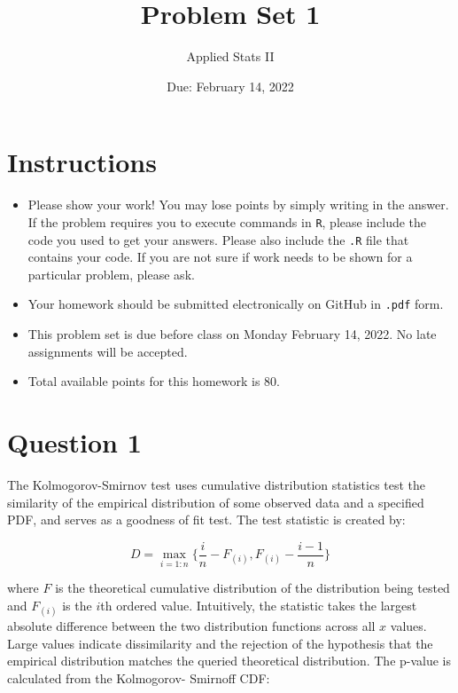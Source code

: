 \documentclass[12pt,letterpaper]{article}
\title{Problem Set 1}
\date{Due: February 14, 2022}
\author{Applied Stats II}
\begin{document}
	\maketitle
	\section*{Instructions}
	\begin{itemize}
		\item Please show your work! You may lose points by simply writing in the answer. If the problem requires you to execute commands in \texttt{R}, please include the code you used to get your answers. Please also include the \texttt{.R} file that contains your code. If you are not sure if work needs to be shown for a particular problem, please ask.
		\item Your homework should be submitted electronically on GitHub in \texttt{.pdf} form.
		\item This problem set is due before class on Monday February 14, 2022. No late assignments will be accepted.
		\item Total available points for this homework is 80.
	\end{itemize}

	
	

	\vspace{.25cm}
\section*{Question 1} %
\vspace{.25cm}
\noindent The Kolmogorov-Smirnov test uses cumulative distribution statistics test the similarity of the empirical distribution of some observed data and a specified PDF, and serves as a goodness of fit test. The test statistic is created by:

$$D = \max_{i=1:n} \Big\{ \frac{i}{n}  - F_{(i)}, F_{(i)} - \frac{i-1}{n} \Big\}$$

\noindent where $F$ is the theoretical cumulative distribution of the distribution being tested and $F_{(i)}$ is the $i$th ordered value. Intuitively, the statistic takes the largest absolute difference between the two distribution functions across all $x$ values. Large values indicate dissimilarity and the rejection of the hypothesis that the empirical distribution matches the queried theoretical distribution. The p-value is calculated from the Kolmogorov-
Smirnoff CDF:
\end{document}
